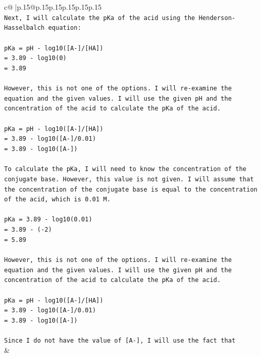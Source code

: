 \documentclass{article}
\begin{document}
{\begin{supertabular}{c@{$\;$}|p{.15\linewidth}@{}p{.15\linewidth}p{.15\linewidth}p{.15\linewidth}p{.15\linewidth}p{.15\linewidth}}
{{{\\ 
\texttt{Next, I will calculate the pKa of the acid using the Henderson{-}Hasselbalch equation:} \\
\\ 
\texttt{pKa = pH {-} log10({[}A{-}{]}/{[}HA{]})} \\
\texttt{= 3.89 {-} log10(0)} \\
\texttt{= 3.89} \\
\\ 
\texttt{However, this is not one of the options. I will re{-}examine the equation and the given values. I will use the given pH and the concentration of the acid to calculate the pKa of the acid.} \\
\\ 
\texttt{pKa = pH {-} log10({[}A{-}{]}/{[}HA{]})} \\
\texttt{= 3.89 {-} log10({[}A{-}{]}/0.01)} \\
\texttt{= 3.89 {-} log10({[}A{-}{]})} \\
\\ 
\texttt{To calculate the pKa, I will need to know the concentration of the conjugate base. However, this value is not given. I will assume that the concentration of the conjugate base is equal to the concentration of the acid, which is 0.01 M.} \\
\\ 
\texttt{pKa = 3.89 {-} log10(0.01)} \\
\texttt{= 3.89 {-} ({-}2)} \\
\texttt{= 5.89} \\
\\ 
\texttt{However, this is not one of the options. I will re{-}examine the equation and the given values. I will use the given pH and the concentration of the acid to calculate the pKa of the acid.} \\
\\ 
\texttt{pKa = pH {-} log10({[}A{-}{]}/{[}HA{]})} \\
\texttt{= 3.89 {-} log10({[}A{-}{]}/0.01)} \\
\texttt{= 3.89 {-} log10({[}A{-}{]})} \\
\\ 
\texttt{Since I do not have the value of {[}A{-}{]}, I will use the fact that} \\
            }
        }
    }
    & \\ \\

\end{supertabular}
}
\end{document}
